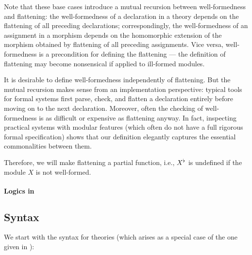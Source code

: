 Note that these base cases introduce a mutual recursion between well-formedness and flattening:
the well-formedness of a declaration in a theory depends on the flattening of all preceding declarations;
correspondingly, the well-formedness of an assignment in a morphism depends on the homomorphic extension of the morphism obtained by flattening of all preceding assignments.
Vice versa, well-formedness is a precondition for defining the flattening --- the definition of flattening may become nonsensical if applied to ill-formed modules.

It is desirable to define well-formedness independently of flattening.
But the mutual recursion makes sense from an implementation perspective: typical tools for formal systems first parse, check, and flatten a declaration entirely before moving on to the next declaration.
Moreover, often the checking of well-formedness is as difficult or expensive as flattening anyway.
In fact, inspecting practical systems with modular features (which often do not have a full rigorous formal specification) shows that our definition elegantly captures the essential commonalities between them.

Therefore, we will make flattening a partial function, i.e., $X^\flat$ is undefined if the module $X$ is not well-formed. 

%

\paragraph{Logics in \mmt}

\subsection{Syntax}

We start with the syntax for theories (which arises as a special case of the one given in \cite{RK:mmt:10}):

